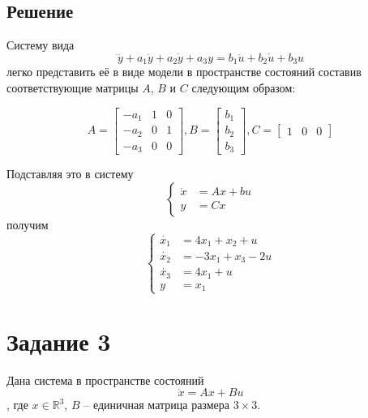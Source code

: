     \subsection*{Решение}
    Систему вида \[\dddot{y} + a_{1}\ddot{y} + a_{2}\dot{y} + a_{3}y = b_{1}\ddot{u} + b_{2}\dot{u} + b_{3}u\]
    легко представить её в виде модели в пространстве состояний составив соответствующие матрицы $A$, $B$ и $C$
    следующим образом:

    \begin{equation*}
        A =
        \begin{bmatrix}
            -a_1& 1& 0\\
            -a_2& 0& 1\\
            -a_3& 0& 0
        \end{bmatrix}
        , B =
        \begin{bmatrix}
            b_1\\
            b_2\\
            b_3
        \end{bmatrix}
        , C =
        \begin{bmatrix}
            1& 0& 0
        \end{bmatrix}
    \end{equation*}

    Подставляя это в систему
    \begin{equation*}
        \left\{
        \begin{aligned}
            \dot{x} &= Ax + bu\\
            y &= Cx
        \end{aligned}
        \right.
    \end{equation*}
    получим
    \begin{equation*}
        \left\{
        \begin{aligned}
            \dot{x_{1}} &= 4x_{1} + x_{2} + u\\
            \dot{x_{2}} &= -3x_{1} + x_{3} - 2u\\
            \dot{x_{3}} &= 4x_{1} + u\\
            y &= x_1
        \end{aligned}
        \right.
    \end{equation*}

    \section*{Задание 3}
    Дана система в пространстве состояний \[\dot{x} = Ax + Bu\], где $x \in \mathbb{R}^3$, $B$ -- единичная матрица
    размера $3 \times 3$.

